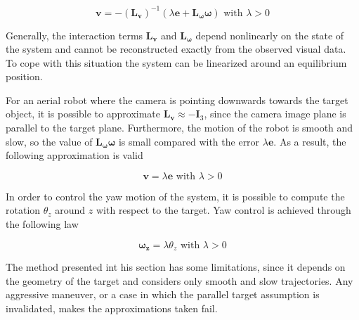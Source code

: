 \begin{equation}
\bm{v} = - (\bm{L_v})^{-1} (\lambda \bm{e} + \bm{L_\omega} \bm{\omega}) \text{ with } \lambda > 0
\end{equation}

Generally, the interaction terms $\bm{L_v}$ and $\bm{L_\omega}$ depend nonlinearly on the state of the system and cannot be reconstructed exactly from the observed visual data. To cope with this situation the system can be linearized around an equilibrium position.

For an aerial robot where the camera is pointing downwards towards the target object, it is possible to approximate $\bm{L_v} \approx - \bm{I}_3$, since the camera image plane is parallel to the target plane. Furthermore, the motion of the robot is smooth and slow, so the value of $\bm{L_\omega} \bm{\omega}$ is small compared with the error $\lambda \bm{e}$. As a result, the following approximation is valid

\begin{equation}
\bm{v} = \lambda \bm{e} \text{ with } \lambda > 0
\end{equation}

In order to control the yaw motion of the system, it is possible to compute the rotation $\theta_z$ around $z$ with respect to the target. Yaw control is achieved through the following law

\begin{equation}
\bm{\omega_z} = \lambda \theta_z \text{ with } \lambda > 0
\end{equation}

The method presented int his section has some limitations, since it depends on the geometry of the target and considers only smooth and slow trajectories. Any aggressive maneuver, or a case in which the parallel target assumption is invalidated, makes the approximations taken fail. 

